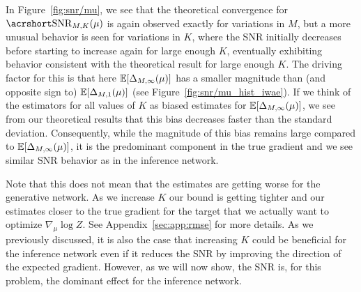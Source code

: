 In Figure~\ref{fig:snr/mu}, we see that
the theoretical convergence for $\SNR_{M,K}(\mu)$
is again observed exactly for variations in $M$, 
but a more unusual behavior is seen for variations in $K$,
where the \gls{SNR} initially decreases before starting to increase again for large enough $K$, 
eventually exhibiting behavior consistent with the theoretical result for large enough $K$.
The driving factor for this is that here
$\mathbb{E} [\Delta_{M,\infty}(\mu)]$  has a smaller magnitude than (and opposite sign to)
$\mathbb{E} [\Delta_{M,1}(\mu)]$  (see Figure~\ref{fig:snr/mu_hist_iwae}).  If we think of the estimators
for all values of $K$ as biased estimates for
$\mathbb{E} [\Delta_{M,\infty}(\mu)]$, we see from our theoretical results that this bias decreases faster 
than the standard deviation.  Consequently, while the magnitude of this bias remains large compared to
$\mathbb{E} [\Delta_{M,\infty}(\mu)]$, it is the predominant component in the true gradient and
we see similar \gls{SNR} behavior as in the inference network.

Note that this does not mean that the 
estimates are getting worse for the generative network.
As we increase $K$ our bound is getting tighter and our estimates closer to
the true gradient for the target that we 
actually want to optimize $\nabla_{\mu} \log Z$.  See 
Appendix~\ref{sec:app:rmse} for more details.
As we previously discussed, it is also the case that increasing $K$ could be beneficial for the inference network
even if it reduces the \gls{SNR} by improving the direction of the expected gradient.
However, as we will now show, the \gls{SNR} is, for this problem,
the dominant effect for the inference network.

